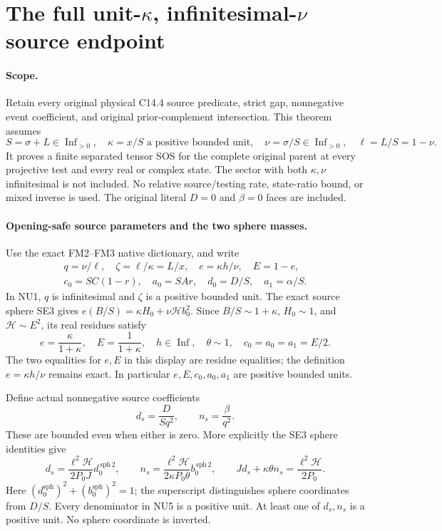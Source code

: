 \section{The full unit-$\kappa$, infinitesimal-$\nu$ source endpoint}
\label{sec:new-c144-nu-endpoint}

\paragraph{Scope.}
Retain every original physical C14.4 source predicate, strict gap,
nonnegative event coefficient, and original prior-complement intersection.
This theorem assumes
\[
 S=\sigma+L\in\operatorname{Inf}_{>0},\quad
 \kappa=x/S\text{ a positive bounded unit},\quad
 \nu=\sigma/S\in\operatorname{Inf}_{>0},\quad\ell=L/S=1-\nu.
 \tag{NU1}
\]
It proves a finite separated tensor SOS for the complete original
parent at every projective test and every real or complex state.
The sector with both $\kappa,\nu$ infinitesimal is not included.
No relative source/testing rate, state-ratio bound, or mixed inverse
is used. The original literal $D=0$ and $\beta=0$ faces are included.

\paragraph{Opening-safe source parameters and the two sphere masses.}
Use the exact FM2--FM3 native dictionary, and write
\[
\begin{gathered}
 q=\nu/\ell,\quad \zeta=\ell/\kappa=L/x,\quad
 e=\kappa h/\nu,\quad E=1-e,\\
 c_0=SC(1-r),\quad a_0=SAr,\quad d_0=D/S,\quad a_1=\alpha/S.
\end{gathered}
 \tag{NU2}
\]
In NU1, $q$ is infinitesimal and $\zeta$ is a positive bounded
unit. The exact source sphere SE3 gives
$e(B/S)=\kappa H_0+\nu\mathcal H b_0^2$.
Since $B/S\sim1+\kappa$, $H_0\sim1$, and
$\mathcal H\sim E^2$, its real residues satisfy
\[
 e=\frac\kappa{1+\kappa},\quad E=\frac1{1+\kappa},\quad
 h\in\operatorname{Inf},\quad\theta\sim1,\quad
 c_0=a_0=a_1=E/2.
 \tag{NU3}
\]
The two equalities for $e,E$ in this display are residue
equalities; the definition $e=\kappa h/\nu$ remains exact.
In particular $e,E,c_0,a_0,a_1$ are positive bounded units.

Define actual nonnegative source coefficients
\[
 d_s=\frac{D}{Sq^2},\qquad n_s=\frac\beta{q^2}.
 \tag{NU4}
\]
These are bounded even when either is zero. More explicitly the
SE3 sphere identities give
\[
 d_s=\frac{\ell^2\mathcal H}{2P_0J}d_0^{\,\mathrm{sph}\,2},
 \qquad
 n_s=\frac{\ell^2\mathcal H}{2\kappa P_0\theta}
                                   b_0^{\,\mathrm{sph}\,2},
 \qquad
 Jd_s+\kappa\theta n_s=\frac{\ell^2\mathcal H}{2P_0}.
 \tag{NU5}
\]
Here $(d_0^{\mathrm{sph}})^2+(b_0^{\mathrm{sph}})^2=1$;
the superscript distinguishes sphere coordinates from $D/S$.
Every denominator in NU5 is a positive unit. At least one of
$d_s,n_s$ is a positive unit. No sphere coordinate is inverted.

